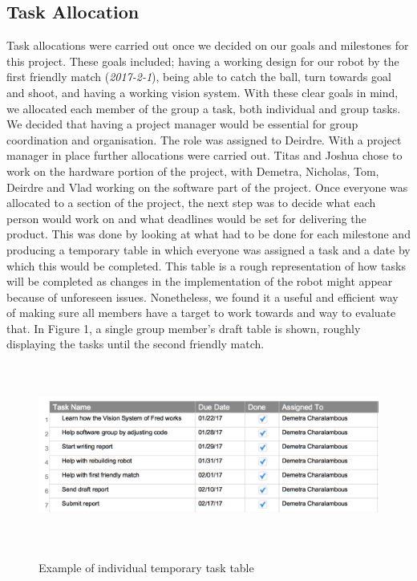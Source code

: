 \documentclass{article}
\begin{document}
\subsection{Task Allocation}
Task allocations were carried out once we decided on our goals and milestones
for this project. These goals included; having a working design for our robot by
the first friendly match (\textit{2017-2-1}), being able to catch the ball, turn
towards goal and shoot, and having a working vision system. With these clear
goals in mind, we allocated each member of the group a task, both individual and
group tasks. We decided that having a project manager would be essential for
group coordination and organisation. The role was assigned to Deirdre. With a
project manager in place further allocations were carried out. Titas and Joshua
chose to work on the hardware portion of the project, with Demetra, Nicholas,
Tom, Deirdre and Vlad working on the software part of the project. Once everyone
was allocated to a section of the project, the next step was to decide what each
person would work on and what deadlines would be set for delivering the product.
This was done by looking at what had to be done for each milestone and producing
a temporary table in which everyone was assigned a task and a date by which this
would be completed. This table is a rough representation of how tasks will be
completed as changes in the implementation of the robot might appear because of
unforeseen issues. Nonetheless, we found it a useful and efficient way of making
sure all members have a target to work towards and way to evaluate that. In
Figure 1, a single group member's draft table is shown, roughly displaying the
tasks until the second friendly match.

\begin{figure}[H]
	\centering
	\begin{minipage}{1\textwidth}
		\centering
		\includegraphics[width=16cm, height=6cm]{task_D.png}\\
		\caption{Example of individual temporary task table}
	\end{minipage}%
\end{figure}
\end{document}

